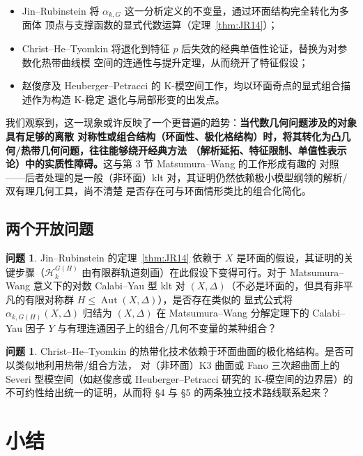 \documentclass[11pt,a4paper]{article}
\theoremstyle{definition}
\newtheorem{question}[theorem]{问题}
\theoremstyle{remark}
\DeclareMathOperator{\Aut}{Aut}
\begin{document}
\begin{itemize}[leftmargin=1.6em]
  \item Jin--Rubinstein 将 $\alpha_{k,G}$ 这一分析定义的不变量，通过环面结构完全转化为多面体
  顶点与支撑函数的显式代数运算（定理~\ref{thm:JR14}）；
  \item Christ--He--Tyomkin 将退化到特征 $p$ 后失效的经典单值性论证，替换为对参数化热带曲线模
  空间的连通性与提升定理，从而绕开了特征假设；
  \item 赵俊彦及 Heuberger--Petracci 的 K-模空间工作，均以环面奇点的显式组合描述作为构造 K-稳定
  退化与局部形变的出发点。
\end{itemize}

我们观察到，这一现象或许反映了一个更普遍的趋势：\textbf{当代数几何问题涉及的对象具有足够的离散
对称性或组合结构（环面性、极化格结构）时，将其转化为凸几何/热带几何问题，往往能够绕开经典方法
（解析延拓、特征限制、单值性表示论）中的实质性障碍。}这与第 3 节 Matsumura--Wang 的工作形成有趣的
对照——后者处理的是一般（非环面）klt 对，其证明仍然依赖极小模型纲领的解析/双有理几何工具，尚不清楚
是否存在可与环面情形类比的组合化简化。

\subsection{两个开放问题}

\begin{question}
Jin--Rubinstein 的定理~\ref{thm:JR14} 依赖于 $X$ 是环面的假设，其证明的关键步骤（$\mathcal{H}_k^{G(H)}$
由有限群轨道刻画）在此假设下变得可行。对于 Matsumura--Wang 意义下的对数 Calabi--Yau 型 klt 对
$(X,\Delta)$（不必是环面的，但具有非平凡的有限对称群 $H \le \Aut(X,\Delta)$），是否存在类似的
显式公式将 $\alpha_{k,G(H)}(X,\Delta)$ 归结为 $(X,\Delta)$ 在 Matsumura--Wang 分解定理下的
Calabi--Yau 因子 $Y$ 与有理连通因子上的组合/几何不变量的某种组合？
\end{question}

\begin{question}
Christ--He--Tyomkin 的热带化技术依赖于环面曲面的极化格结构。是否可以类似地利用热带/组合方法，
对（非环面）K3 曲面或 Fano 三次超曲面上的 Severi 型模空间（如赵俊彦或 Heuberger--Petracci 研究的
K-模空间的边界层）的不可约性给出统一的证明，从而将 \S 4 与 \S 5 的两条独立技术路线联系起来？
\end{question}

\section{小结}
\end{document}
